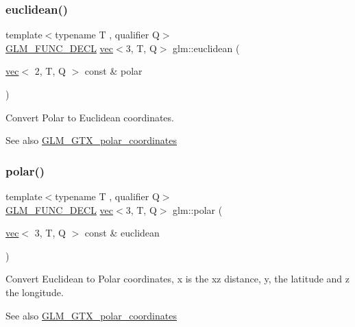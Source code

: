 \subsubsection{\texorpdfstring{euclidean()}{euclidean()}}
{\footnotesize\ttfamily template$<$typename T , qualifier Q$>$ \\
\mbox{\hyperlink{setup_8hpp_ab2d052de21a70539923e9bcbf6e83a51}{G\+L\+M\+\_\+\+F\+U\+N\+C\+\_\+\+D\+E\+CL}} \mbox{\hyperlink{structglm_1_1vec}{vec}}$<$3, T, Q$>$ glm\+::euclidean (\begin{DoxyParamCaption}\item[{\mbox{\hyperlink{structglm_1_1vec}{vec}}$<$ 2, T, Q $>$ const \&}]{polar }\end{DoxyParamCaption})}

Convert Polar to Euclidean coordinates.

\begin{DoxySeeAlso}{See also}
\mbox{\hyperlink{group__gtx__polar__coordinates}{G\+L\+M\+\_\+\+G\+T\+X\+\_\+polar\+\_\+coordinates}} 
\end{DoxySeeAlso}
\mbox{\label{group__gtx__polar__coordinates_gab83ac2c0e55b684b06b6c46c28b1590d}} 
\subsubsection{\texorpdfstring{polar()}{polar()}}
{\footnotesize\ttfamily template$<$typename T , qualifier Q$>$ \\
\mbox{\hyperlink{setup_8hpp_ab2d052de21a70539923e9bcbf6e83a51}{G\+L\+M\+\_\+\+F\+U\+N\+C\+\_\+\+D\+E\+CL}} \mbox{\hyperlink{structglm_1_1vec}{vec}}$<$3, T, Q$>$ glm\+::polar (\begin{DoxyParamCaption}\item[{\mbox{\hyperlink{structglm_1_1vec}{vec}}$<$ 3, T, Q $>$ const \&}]{euclidean }\end{DoxyParamCaption})}

Convert Euclidean to Polar coordinates, x is the xz distance, y, the latitude and z the longitude.

\begin{DoxySeeAlso}{See also}
\mbox{\hyperlink{group__gtx__polar__coordinates}{G\+L\+M\+\_\+\+G\+T\+X\+\_\+polar\+\_\+coordinates}} 
\end{DoxySeeAlso}
